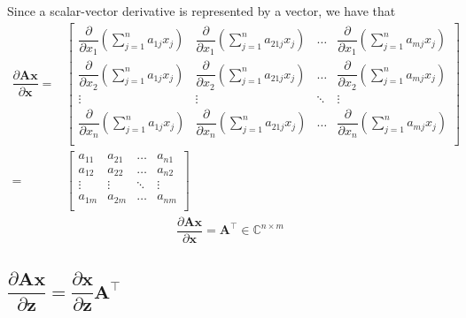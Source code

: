 \documentclass{article}
\newcommand{\trans}{\top}
\begin{document}
Since a scalar-vector derivative is represented by a vector, we have that
\begin{align}
    \dfrac{\partial \mathbf{A} \mathbf{x}}{\partial \mathbf{x}} = & \begin{bmatrix}
        \dfrac{\partial}{\partial x_1} \left( \sum_{j = 1}^n a_{1j}x_j \right) & 
        \dfrac{\partial}{\partial x_1} \left( \sum_{j = 1}^n a_{21j}x_j \right) & 
        \dots & 
        \dfrac{\partial}{\partial x_1} \left( \sum_{j = 1}^n a_{mj}x_j \right) \\
        \dfrac{\partial}{\partial x_2} \left( \sum_{j = 1}^n a_{1j}x_j \right) & 
        \dfrac{\partial}{\partial x_2} \left( \sum_{j = 1}^n a_{21j}x_j \right) & 
        \dots & 
        \dfrac{\partial}{\partial x_2} \left( \sum_{j = 1}^n a_{mj}x_j \right) \\
        \vdots & \vdots & \ddots & \vdots \\
        \dfrac{\partial}{\partial x_n} \left( \sum_{j = 1}^n a_{1j}x_j \right) & 
        \dfrac{\partial}{\partial x_n} \left( \sum_{j = 1}^n a_{21j}x_j \right) & 
        \dots & 
        \dfrac{\partial}{\partial x_n} \left( \sum_{j = 1}^n a_{mj}x_j \right) \\
    \end{bmatrix}  \\
    = & \begin{bmatrix}
        a_{11} & a_{21} & \dots & a_{n1} \\
        a_{12} & a_{22} & \dots & a_{n2} \\
        \vdots & \vdots & \ddots & \vdots \\
        a_{1m} & a_{2m} & \dots & a_{nm} \\
    \end{bmatrix}
\end{align}
\begin{align}
    \label{eq:lt-slution}
    \boxed{\dfrac{\partial \mathbf{A} \mathbf{x}}{\partial \mathbf{x}} = \mathbf{A}^\trans \in \mathbb{C}^{n\times m}}
\end{align}

\subsection{\(\dfrac{\partial \mathbf{A}  \mathbf{x}}{\partial \mathbf{z}} = \dfrac{\partial \mathbf{x}}{\partial \mathbf{z}} \mathbf{A}^\trans\)}
\end{document}
